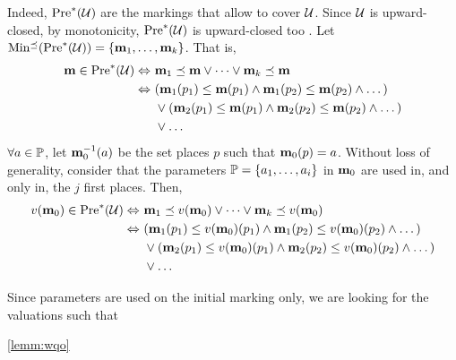 Indeed,
$\operatorname{Pre}^*_{}(\mathcal{U})$ are the markings that allow to cover $\mathcal{U}$.
Since $\mathcal{U}$ is upward-closed, by monotonicity, $\operatorname{Pre}^*_{}(\mathcal{U})$ is upward-closed too .
Let $\operatorname{Min^\preceq}(\operatorname{Pre}^*_{}(\mathcal{U})) = \{\mathbf{m}_1, \dots, \mathbf{m}_k\}$.
That is,
\begin{align*}
  \mathbf{m} \in \operatorname{Pre}^*_{}(\mathcal{U}) \Leftrightarrow \ &
    \mathbf{m}_1 \preceq \mathbf{m} \vee \dots \vee \mathbf{m}_k \preceq \mathbf{m} \\
  \Leftrightarrow \ &
    (\mathbf{m}_1(p_1) \leq \mathbf{m}(p_1) \wedge \mathbf{m}_1(p_2) \leq \mathbf{m}(p_2) \wedge \dots) \\
  &\vee
    (\mathbf{m}_2(p_1) \leq \mathbf{m}(p_1) \wedge \mathbf{m}_2(p_2) \leq \mathbf{m}(p_2) \wedge \dots) \\
  &\vee \dots
\end{align*}
$\forall \param \in \parameters$,
let $\mar_0^{-1}(\param)$ be the set places $p$ such that $\mar_0(p) = \param$.
Without loss of generality, consider that the parameters $\parameters = \{\param_1, \dots, \param_i\}$ in $\mathbf{m}_0$ are used in, and only in, the $j$ first places.
Then,
\begin{align*}
  \val[\mar_0] \in \pres{\ucs} \Leftrightarrow \ &
    \mar_1 \preceq \val[\mar_0] \vee \dots \vee \mar_k \preceq \val[\mar_0] \\
  \Leftrightarrow \ &
    (\mar_1(p_1) \leq \val[\mar_0](p_1) \wedge \mar_1(p_2) \leq \val[\mar_0](p_2) \wedge \dots) \\
  &\vee
    (\mar_2(p_1) \leq \val[\mar_0](p_1) \wedge \mar_2(p_2) \leq \val[\mar_0](p_2) \wedge \dots) \\
  &\vee \dots
\end{align*}



Since parameters are used on the initial marking only,
we are looking for the valuations such that 


\cref{lemm:wqo}
